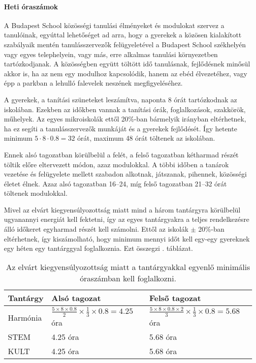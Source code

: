 \paragraph{Heti óraszámok}

A Budapest School közösségi tanulási élményeket és modulokat szervez a tanulóinak, egyúttal lehetőséget ad arra, hogy a gyerekek a közösen kialakított szabályaik mentén tanulásszervezők felügyeletével a Budapest School székhelyén vagy egyes telephelyein, vagy más, erre alkalmas tanulási környezetben tartózkodjanak. A közösségben együtt töltött idő tanulásnak, fejlődésnek minősül akkor is, ha az nem egy modulhoz kapcsolódik, hanem az ebéd élvezetéhez, vagy épp a parkban a lehulló falevelek neszének megfigyeléséhez.

A gyerekek, a tanítási szüneteket leszámítva, naponta 8 órát tartózkodnak az iskolában. Ezekben az időkben vannak a tanítási órák, foglalkozások, szakkörök, műhelyek. Az egyes mikroiskolák ettől 20\%-ban bármelyik irányban eltérhetnek, ha ez segíti a tanulásszervezők munkáját és a gyerekek fejlődését. Így hetente minimum $5 \cdot 8 \cdot 0.8 = 32$ órát, maximum 48 órát töltenek az iskolában.

Ennek alsó tagozatban körülbelül a felét, a felső tagozatban kétharmad részét töltik előre eltervezett módon, azaz modulokkal. A többi időben a tanárok vezetése és felügyelete mellett szabadon alkotnak, játszanak, pihennek, közösségi életet élnek. Azaz alsó tagozatban 16--24, míg felső tagozatban 21--32 órát töltenek modulokkal.

Mivel az elvárt kiegyensúlyozottság miatt mind a három tantárgyra körülbelül ugyanannyi energiát kell fektetni, így az egyes tantárgyakra a teljes rendelkezésre álló időkeret egyharmad részét kell számolni. Ettől az iskolák $\pm$ 20\%-ban eltérhetnek, így kiszámolható, hogy minimum mennyi időt kell egy-egy gyereknek egy héten egy tantárggyal foglalkoznia. Ezt összegzi . táblázat.


			\begin{table}

				\begin{tabular}{ l|l|l }

					\textbf{Tantárgy} & \textbf{Alsó tagozat} & \textbf{Felső tagozat}\\ \hline
Harmónia & $\frac{5 \times 8 \times 0.8}{2} \times \frac{1}{3} \times 0.8 = 4.25$ óra &
$\frac{5 \times 8 \times 0.8 \times 2}{3} \times \frac{1}{3} \times 0.8 = 5.68$   óra\\ \hline
STEM & 4.25 óra &  5.68 óra\\ \hline
KULT  & 4.25 óra & 5.68 óra\\ \hline

				\end{tabular}
        \caption{Az elvárt kiegyensúlyozottság miatt a tantárgyakkal egyenlő minimális óraszámban kell foglalkozni.}
        \label{tbl:oraszamok}
			\end{table}

